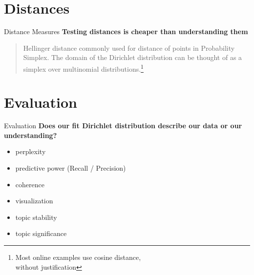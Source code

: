 \documentclass[10pt]{beamer}
\begin{document}
\section{Distances}

\begin{frame}{Distance Measures}
  {\bf Testing distances is cheaper than understanding them}

  \begin{quote}
    Hellinger distance\cite{krstovski2013efficient} commonly used for distance of points in Probability Simplex. The domain of the Dirichlet distribution can be thought of as a simplex over multinomial distributions.\footnote{Most online examples use cosine distance, \\without justification}
  \end{quote}
\end{frame}

\section{Evaluation}

\begin{frame}{Evaluation}
  {\bf Does our fit Dirichlet distribution describe our data or our understanding?}

  \begin{itemize}
  \item perplexity
  \item predictive power (Recall / Precision)
  \item coherence\cite{Roder2015,TACL582}
  \item visualization\cite{sievert-shirley-2014-ldavis,2012-termite}
  \item topic stability\cite{Yang2016}
  \item topic significance\cite{alsumait2009topic}
  \end{itemize}
\end{frame}
\end{document}
